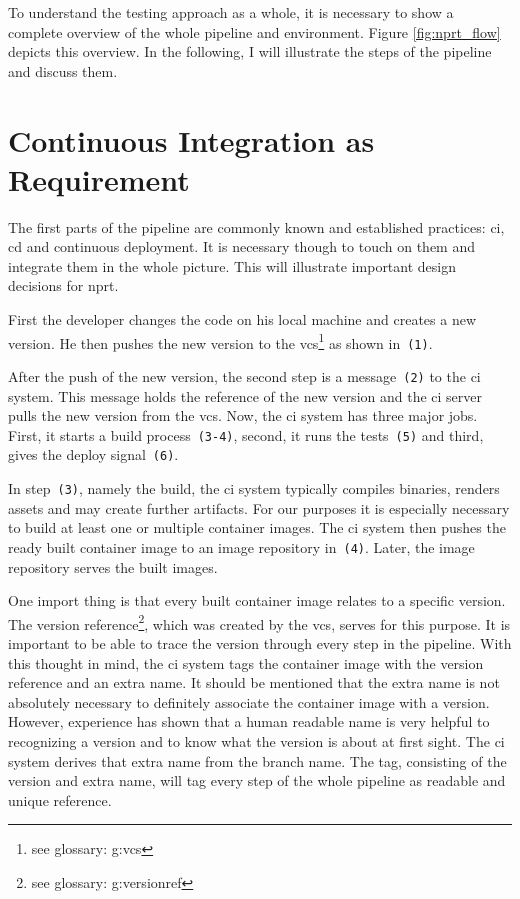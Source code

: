 To understand the testing approach as a whole, it is necessary to show a complete overview
of the whole pipeline and environment. Figure \ref{fig:nprt_flow} depicts this overview. In
the following, I will illustrate the steps of the pipeline and discuss them.

\section{Continuous Integration as Requirement}

The first parts of the pipeline are commonly known and established practices: \gls{ci},
\gls{cd} and continuous deployment. It is necessary though to touch on them and
integrate them in the whole picture. This will illustrate important design decisions for
\gls{nprt}.

First the developer changes the code on his local machine and creates a new version. He
then pushes the new version to the \gls{vcs}\footnote{see glossary: \gls{g:vcs}}
as shown in~\texttt{(1)}.

After the push of the new version, the second step is a message~\texttt{(2)} to the
\gls{ci} system. This message holds the reference of the new version and the \gls{ci}
server pulls the new version from the \gls{vcs}. Now, the \gls{ci} system has three major
jobs. First, it starts a build process~\texttt{(3-4)}, second, it runs the
tests~\texttt{(5)} and third, gives the deploy signal~\texttt{(6)}.

In step~\texttt{(3)}, namely the build, the \gls{ci} system typically compiles binaries,
renders assets and may create further artifacts. For our purposes it is especially
necessary to build at least one or multiple container images. The \gls{ci} system then
pushes the ready built container image to an image repository in~\texttt{(4)}. Later, the
image repository serves the built images.

One import thing is that every built container image relates to a specific version. The
version reference\footnote{see glossary: \gls{g:versionref}}, which was created by the
\gls{vcs}, serves for this purpose. It is important to be able to trace the version
through every step in the pipeline. With this thought in mind, the \gls{ci} system tags
the container image with the version reference and an extra name. It should be
mentioned that the extra name is not absolutely necessary to definitely associate the
container image with a version. However, experience has shown that a human readable name is very
helpful to recognizing a version and to know what the version is about at first sight. The
\gls{ci} system derives that extra name from the branch name. The tag, consisting of
the version and extra name, will tag every step of the whole pipeline as readable and
unique reference.

